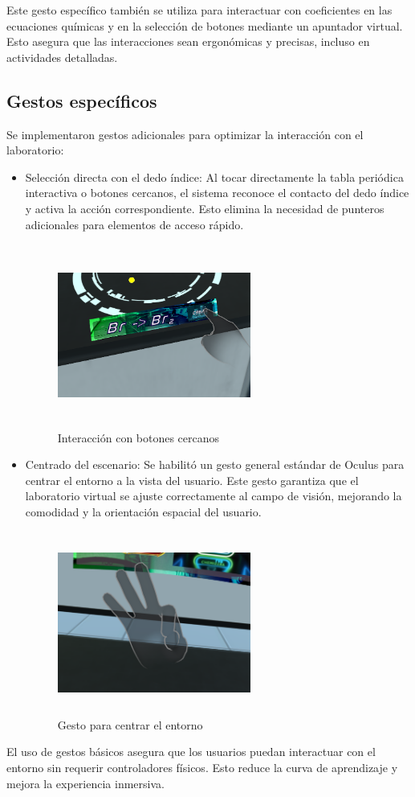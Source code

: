 Este gesto específico también se utiliza para interactuar con coeficientes en las ecuaciones químicas y en la selección de botones mediante un apuntador virtual. Esto asegura que las interacciones sean ergonómicas y precisas, incluso en actividades detalladas.

\subsection{Gestos específicos}
Se implementaron gestos adicionales para optimizar la interacción con el laboratorio:
\begin{itemize}
    \item Selección directa con el dedo índice: Al tocar directamente la tabla periódica interactiva o botones cercanos, el sistema reconoce el contacto del dedo índice y activa la acción correspondiente. Esto elimina la necesidad de punteros adicionales para elementos de acceso rápido.
    \begin{figure}[thbp]
        \centering
        \includegraphics[width=0.6\textwidth, height = 6cm]{img/chapter04/Botones_Cercanos.png}
        \caption{Interacción con botones cercanos}
        \label{fig:Interacción}
    \end{figure}
    \item Centrado del escenario: Se habilitó un gesto general estándar de Oculus para centrar el entorno a la vista del usuario. Este gesto garantiza que el laboratorio virtual se ajuste correctamente al campo de visión, mejorando la comodidad y la orientación espacial del usuario.
    \begin{figure}[thbp]
        \centering
        \includegraphics[width=0.6\textwidth, height = 6cm]{img/chapter04/Centrado.png}
        \caption{Gesto para centrar el entorno}
        \label{fig:Centrar}
    \end{figure}
\end{itemize}
El uso de gestos básicos asegura que los usuarios puedan interactuar con el entorno sin requerir controladores físicos. Esto reduce la curva de aprendizaje y mejora la experiencia inmersiva.
\newpage
